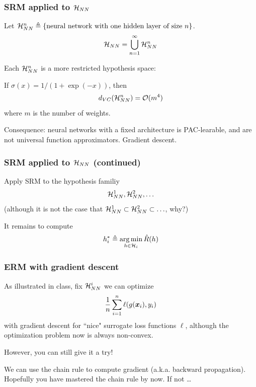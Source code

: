 \documentclass{beamer}
\DeclareMathOperator*{\argmin}{arg\,min}
\begin{document}
\begin{frame}

\frametitle{SRM applied to ${\mathcal H}_{NN}$}

Let ${\mathcal H}_{NN}^n \triangleq \{\text{neural network with one hidden layer of size}\ n\}$.
\[
{\mathcal H}_{NN} = \bigcup_{n = 1}^\infty {\mathcal H}_{NN}^n
\]

Each ${\mathcal H}_{NN}^n$ is a more restricted hypothesis space:
\begin{theorem}
If $\sigma (x) = 1 / (1 + \exp (-x))$, then
\[
d_{VC} ({\mathcal H}_{NN}^n) = {\mathcal O} (m^4)
\]
where $m$ is the number of weights.
\end{theorem}

Consequence: neural networks with a fixed architecture is PAC-learable, and are not universal function approximators.
Gradient descent.

\end{frame}

\begin{frame}

\frametitle{SRM applied to ${\mathcal H}_{NN}$ (continued)}

Apply SRM to the hypothesis familiy
\[
{\mathcal H}_{NN}^1, {\mathcal H}_{NN}^2, \ldots
\]
(although it is not the case that ${\mathcal H}_{NN}^1 \subset {\mathcal H}_{NN}^2 \subset \ldots$, why?)

It remains to compute
\[
h_i^* \triangleq \argmin_{h \in \calh_i} \hat{R} (h)
\]

\end{frame}

\begin{frame}

\frametitle{ERM with gradient descent}

As illustrated in class, fix ${\mathcal H}_{NN}^i$ we can optimize
\[
\frac1n \sum_{i = 1}^n \ell(g({\bm x}_i), y_i)
\]
with gradient descent for ``nice" surrogate loss functions $\ell$, although the optimization problem now is always non-convex.

However, you can still give it a try!

We can use the chain rule to compute gradient (a.k.a. backward propagation).
Hopefully you have mastered the chain rule by now. If not \ldots

\end{frame}
\end{document}
